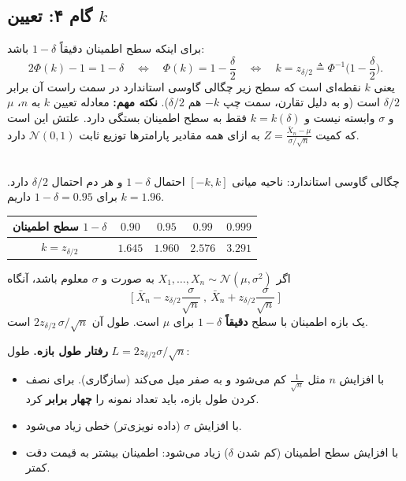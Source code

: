 \subsection{گام ۴: تعیین $k$}
برای اینکه سطح اطمینان دقیقاً $1-\delta$ باشد:
\[
2\Phi(k)-1=1-\delta\quad\Longleftrightarrow\quad\Phi(k)=1-\frac\delta2\quad\Longleftrightarrow\quad k=z_{\delta/2}\triangleq\Phi^{-1}\Big(1-\frac\delta2\Big).
\]
یعنی $k$ نقطه‌ای است که سطح زیر چگالی گاوسی استاندارد در سمت راست آن برابر $\delta/2$ است (و به دلیل تقارن، سمت چپ $-k$ هم $\delta/2$). \textbf{نکته مهم:} معادله تعیین $k$ به $n$، $\mu$ و $\sigma$ وابسته نیست و $k=k(\delta)$ فقط به سطح اطمینان بستگی دارد. علتش این است که کمیت $Z=\frac{\bar X_n-\mu}{\sigma/\sqrt n}$ به ازای همه مقادیر پارامترها توزیع ثابت $\mathcal N(0,1)$ دارد.

\begin{center}
\begin{tikzpicture}
\end{tikzpicture}\\
{\small چگالی گاوسی استاندارد: ناحیه میانی $[-k,k]$ احتمال $1-\delta$ و هر دم احتمال $\delta/2$ دارد. برای $1-\delta=0.95$ داریم $k=1.96$.}
\end{center}

\begin{center}
\renewcommand{\arraystretch}{1.4}
\begin{tabular}{c|c|c|c|c}
سطح اطمینان $1-\delta$ & $0.90$ & $0.95$ & $0.99$ & $0.999$\\\hline
$k=z_{\delta/2}$ & $1.645$ & $1.960$ & $2.576$ & $3.291$
\end{tabular}
\end{center}

\begin{theorem}
اگر $X_1,\ldots,X_n\sim\mathcal N(\mu,\sigma^2)$ به صورت  و $\sigma$ معلوم باشد، آنگاه
\[
\Big[\ \bar X_n-z_{\delta/2}\frac{\sigma}{\sqrt n}\ ,\ \bar X_n+z_{\delta/2}\frac{\sigma}{\sqrt n}\ \Big]
\]
یک بازه اطمینان با سطح \textbf{دقیقاً} $1-\delta$ برای $\mu$ است. طول آن $2z_{\delta/2}\,\sigma/\sqrt n$ است.
\end{theorem}

\begin{note}
\notetitle \textbf{رفتار طول بازه.} طول $L=2z_{\delta/2}\sigma/\sqrt n$:
\begin{itemize}
\item با افزایش $n$ مثل $\frac1{\sqrt n}$ کم می‌شود و به صفر میل می‌کند (سازگاری). برای نصف کردن طول بازه، باید تعداد نمونه را \textbf{چهار برابر} کرد.
\item با افزایش $\sigma$ (داده نویزی‌تر) خطی زیاد می‌شود.
\item با افزایش سطح اطمینان (کم شدن $\delta$) زیاد می‌شود: اطمینان بیشتر به قیمت دقت کمتر.
\end{itemize}
\end{note}

